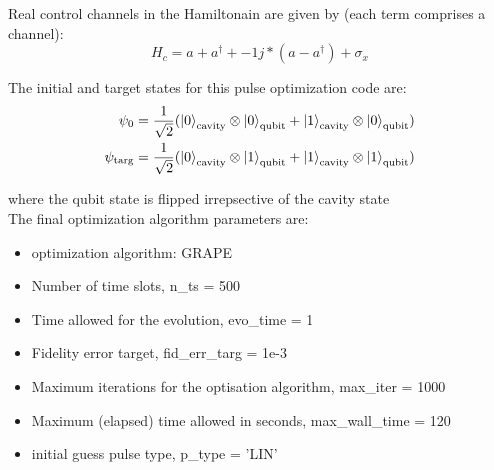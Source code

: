 \documentclass[12pt]{report}
\begin{document}
Real control channels in the Hamiltonain are given by (each term comprises a channel): 
\begin{equation}
    H_c = a + a^{\dagger} + -1j*(a - a^{\dagger}) + \sigma_x    
\end{equation}

The initial and target states for this pulse optimization code are: 
\begin{align*}
    \psi_0 &= \frac{1}{\sqrt{2}} (\ket{0}_{\text{cavity}} \otimes \ket{0}_{\text{qubit}} 
                + \ket{1}_{\text{cavity}} \otimes \ket{0}_{\text{qubit}})\\
    \psi_{\text{targ}} &= \frac{1}{\sqrt{2}} (\ket{0}_{\text{cavity}} \otimes \ket{1}_{\text{qubit}} 
                + \ket{1}_{\text{cavity}} \otimes \ket{1}_{\text{qubit}})\\
\end{align*}

where the qubit state is flipped irrepsective of the cavity state
\\
The final optimization algorithm parameters are:
\\ 
\begin{itemize}
    \item optimization algorithm: GRAPE
    \item Number of time slots, n\_ts = 500
    \item Time allowed for the evolution, evo\_time = 1
    \item Fidelity error target, fid\_err\_targ = 1e-3
    \item Maximum iterations for the optisation algorithm, max\_iter = 1000
    \item Maximum (elapsed) time allowed in seconds, max\_wall\_time = 120
    \item initial guess pulse type, p\_type = 'LIN'
\end{itemize}
\end{document}
